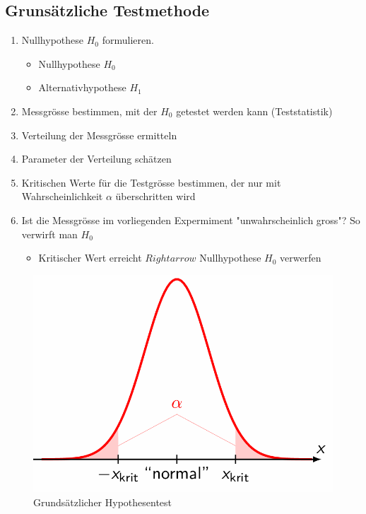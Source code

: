 \documentclass[../Main.tex]{subfiles}
\begin{document}
\subsection{Grunsätzliche Testmethode}
\begin{enumerate}
    \item Nullhypothese \(H_0\) formulieren.
    \begin{itemize}
        \item Nullhypothese \(H_0\)
        \item Alternativhypothese \(H_1\)
    \end{itemize}
    \item Messgrösse bestimmen, mit der \(H_0\) getestet werden kann (Teststatistik)
    \item Verteilung der Messgrösse ermitteln
    \item Parameter der Verteilung schätzen
    \item Kritischen Werte für die Testgrösse bestimmen, der nur mit Wahrscheinlichkeit \(\alpha\) überschritten wird
    \item Ist die Messgrösse im vorliegenden Expermiment "unwahrscheinlich gross"? So verwirft man \(H_0\)
    \begin{itemize}
        \item Kritischer Wert erreicht \(Rightarrow\) Nullhypothese \(H_0\) verwerfen
    \end{itemize}
\end{enumerate}

\begin{figure}[H]
    \centering
    \includegraphics[width=0.5\linewidth]{Images/hypo-test.png}
    \caption{Grundsätzlicher Hypothesentest}
\end{figure}
\end{document}
